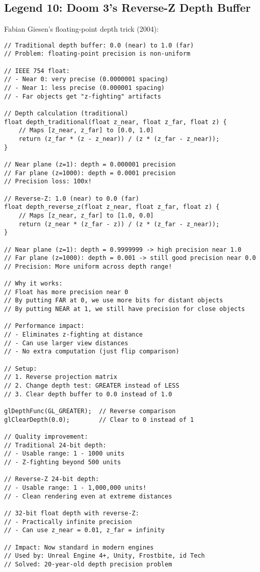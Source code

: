 \subsection{Legend 10: Doom 3's Reverse-Z Depth Buffer}

Fabian Giesen's floating-point depth trick (2004):

\begin{lstlisting}
// Traditional depth buffer: 0.0 (near) to 1.0 (far)
// Problem: floating-point precision is non-uniform

// IEEE 754 float:
// - Near 0: very precise (0.0000001 spacing)
// - Near 1: less precise (0.000001 spacing)
// - Far objects get "z-fighting" artifacts

// Depth calculation (traditional)
float depth_traditional(float z_near, float z_far, float z) {
    // Maps [z_near, z_far] to [0.0, 1.0]
    return (z_far * (z - z_near)) / (z * (z_far - z_near));
}

// Near plane (z=1): depth = 0.000001 precision
// Far plane (z=1000): depth = 0.0001 precision
// Precision loss: 100x!

// Reverse-Z: 1.0 (near) to 0.0 (far)
float depth_reverse_z(float z_near, float z_far, float z) {
    // Maps [z_near, z_far] to [1.0, 0.0]
    return (z_near * (z_far - z)) / (z * (z_far - z_near));
}

// Near plane (z=1): depth = 0.9999999 -> high precision near 1.0
// Far plane (z=1000): depth = 0.001 -> still good precision near 0.0
// Precision: More uniform across depth range!

// Why it works:
// Float has more precision near 0
// By putting FAR at 0, we use more bits for distant objects
// By putting NEAR at 1, we still have precision for close objects

// Performance impact:
// - Eliminates z-fighting at distance
// - Can use larger view distances
// - No extra computation (just flip comparison)

// Setup:
// 1. Reverse projection matrix
// 2. Change depth test: GREATER instead of LESS
// 3. Clear depth buffer to 0.0 instead of 1.0

glDepthFunc(GL_GREATER);  // Reverse comparison
glClearDepth(0.0);        // Clear to 0 instead of 1

// Quality improvement:
// Traditional 24-bit depth:
// - Usable range: 1 - 1000 units
// - Z-fighting beyond 500 units

// Reverse-Z 24-bit depth:
// - Usable range: 1 - 1,000,000 units!
// - Clean rendering even at extreme distances

// 32-bit float depth with reverse-Z:
// - Practically infinite precision
// - Can use z_near = 0.01, z_far = infinity

// Impact: Now standard in modern engines
// Used by: Unreal Engine 4+, Unity, Frostbite, id Tech
// Solved: 20-year-old depth precision problem
\end{lstlisting}

